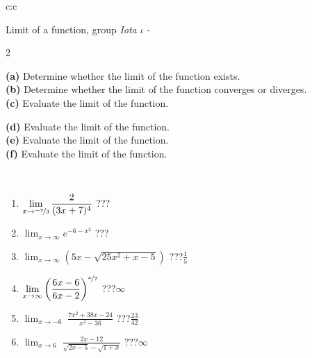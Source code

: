 \documentclass[10pt]{report}
\begin{document}
\newpage
\thispagestyle{empty}
\begin{tabular}{c:c}
\begin{minipage}[c][104.5mm][t]{0.5\linewidth}
\begin{center}
\vspace{5mm}
{\huge Limit of a function, group \textit{Iota $\iota$} -}\\[5mm]
\begin{minipage}{0.95\linewidth}
\begin{center}
{\small \begin{multicols}{2} \raggedright
\textbf{(a)} Determine whether the limit of the function exists. \\[1mm]
\textbf{(b)} Determine whether the limit of the function converges or diverges. \\[1mm]
\textbf{(c)} Evaluate the limit of the function. \par \columnbreak
\textbf{(d)} Evaluate the limit of the function. \\[1mm]
\textbf{(e)} Evaluate the limit of the function. \\[1mm]
\textbf{(f)} Evaluate the limit of the function. \\[1mm]
\end{multicols}
}
\end{center}
\end{minipage}
\\[1mm]
\begin{minipage}{0.79\linewidth}
\begin{center}
\begin{varwidth}{\linewidth}
\setlength{\itemsep}{0pt}
\begin{enumerate}
\normalsize
\item $\displaystyle\lim_{x\to\nicefrac{-7}{3}}{\frac{2}{(3x+7)^{4}}}$\quad \dotfill\; ???\;\dotfill \quad {}
\item $\displaystyle\lim_{x\to\infty}{e^{-6-x^2}}$\quad \dotfill\; ???\;\dotfill \quad {}
\item $\displaystyle\lim_{x\to\infty}{\left(5x - \sqrt{25x^2+x-5}\right)}$\quad \dotfill\; ???\;\dotfill \quad $\frac{1}{5}$
\item $\displaystyle\lim_{x\to\infty}{\left( \frac{6x-6}{6x-2} \right)^{\nicefrac{x}{7}}}$\quad \dotfill\; ???\;\dotfill \quad $\infty$
\item $\displaystyle\lim_{x\to -6}{\;\frac{7x^2+38x-24}{x^2-36}}$\quad \dotfill\; ???\;\dotfill \quad $\frac{23}{42}$
\item $\displaystyle\lim_{x\to 6}{\;\frac{2x-12}{\sqrt{2x-5} - \sqrt{1+x}}}$\quad \dotfill\; ???\;\dotfill \quad $\infty$

\end{enumerate}
\end{varwidth}
\end{center}
\end{minipage}
\end{center}
\end{minipage}
\end{tabular}
\end{document}
